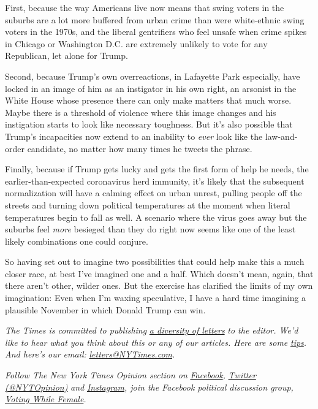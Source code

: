 First, because the way Americans live now means that swing voters in the
suburbs are a lot more buffered from urban crime than were white-ethnic
swing voters in the 1970s, and the liberal gentrifiers who feel unsafe
when crime spikes in Chicago or Washington D.C. are extremely unlikely
to vote for any Republican, let alone for Trump.

Second, because Trump's own overreactions, in Lafayette Park especially,
have locked in an image of him as an instigator in his own right, an
arsonist in the White House whose presence there can only make matters
that much worse. Maybe there is a threshold of violence where this image
changes and his instigation starts to look like necessary toughness. But
it's also possible that Trump's incapacities now extend to an inability
to \emph{ever} look like the law-and-order candidate, no matter how many
times he tweets the phrase.

Finally, because if Trump gets lucky and gets the first form of help he
needs, the earlier-than-expected coronavirus herd immunity, it's likely
that the subsequent normalization will have a calming effect on urban
unrest, pulling people off the streets and turning down political
temperatures at the moment when literal temperatures begin to fall as
well. A scenario where the virus goes away but the suburbs feel
\emph{more} besieged than they do right now seems like one of the least
likely combinations one could conjure.

So having set out to imagine two possibilities that could help make this
a much closer race, at best I've imagined one and a half. Which doesn't
mean, again, that there aren't other, wilder ones. But the exercise has
clarified the limits of my own imagination: Even when I'm waxing
speculative, I have a hard time imagining a plausible November in which
Donald Trump can win.

\emph{The Times is committed to publishing}
\href{https://www.nytimes3xbfgragh.onion/2019/01/31/opinion/letters/letters-to-editor-new-york-times-women.html}{\emph{a
diversity of letters}} \emph{to the editor. We'd like to hear what you
think about this or any of our articles. Here are some}
\href{https://help.nytimes3xbfgragh.onion/hc/en-us/articles/115014925288-How-to-submit-a-letter-to-the-editor}{\emph{tips}}\emph{.
And here's our email:}
\href{mailto:letters@NYTimes.com}{\emph{letters@NYTimes.com}}\emph{.}

\emph{Follow The New York Times Opinion section on}
\href{https://www.facebookcorewwwi.onion/nytopinion}{\emph{Facebook}}\emph{,}
\href{http://twitter.com/NYTOpinion}{\emph{Twitter (@NYTOpinion)}}
\emph{and}
\href{https://www.instagram.com/nytopinion/}{\emph{Instagram}}\emph{,
join the Facebook political discussion group,}
\href{https://www.facebookcorewwwi.onion/groups/votingwhilefemale/}{\emph{Voting
While Female}}\emph{.}

